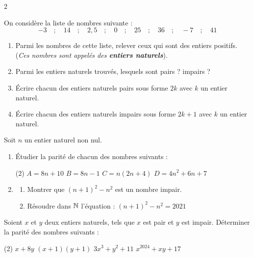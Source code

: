 \documentclass[10pt, a4paper]{article}
\begin{document}
\vspace{0.2cm}

\begin{multicols*}{2}


\begin{Activite}[][10 min]
On considère la liste de nombres suivante :
$$-3 \quad ; \quad 14 \quad ; \quad 2,5 \quad ; \quad 0 \quad ; \quad 25 \quad ; \quad 36 \quad ; \quad -7 \quad ; \quad 41$$
\begin{enumerate}[leftmargin=*,itemsep=0.5pt]
    \item Parmi les nombres de cette liste, relever ceux qui sont des entiers positifs. 
    (\textit{Ces nombres sont appelés des \textbf{entiers naturels}}).

    \item Parmi les entiers naturels trouvés, lesquels sont pairs ? impairs ?

    \item Écrire chacun des entiers naturels pairs sous forme $2k$ avec $k$ un entier naturel.
    \item Écrire chacun des entiers naturels impairs sous forme $2k+1$ avec $k$ un entier naturel.
\end{enumerate}
\end{Activite}

\begin{Application}[][15 min]
Soit $n$ un entier naturel non nul.
\begin{enumerate}[leftmargin=*,itemsep=0.5pt]
    \item Étudier la parité de chacun des nombres suivants :
\begin{tasks}[label=$\bullet$, label-width=12pt, item-indent=15pt](2)
    \task $A=8n+10$
    \task $B=8n-1$
    \task $C=n(2n+4)$
    \task $D=4n^2+6n+7$
\end{tasks}
    \item
    \begin{enumerate}[leftmargin=*,itemsep=0.5pt]
        \item Montrer que $(n + 1)^2 - n^2$ est un nombre impair.
        \item Résoudre dans $\mathbb{N}$ l'équation : $(n + 1)^2 - n^2 = 2021$
    \end{enumerate}
\end{enumerate}
\end{Application}

\begin{Application}[][15 min]
Soient $x$  et $y$ deux entiers naturels, tels que $x$ est pair et $y$ est impair. Déterminer la parité des nombres suivants :
\vspace{0.3cm}
\begin{center}
\begin{tasks}[label=$\bullet$, label-width=10pt, item-indent=25pt](2)
    \task $x + 8y$
    \task $(x + 1)(y + 1)$
    \task $3x^3 + y^2 + 11$
    \task $x^{2024} + xy + 17$
\end{tasks}
\end{center}
\end{Application}


\end{multicols*}
\end{document}
